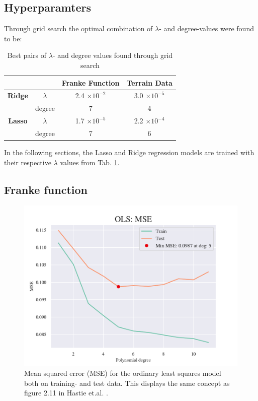 \subsection{Hyperparamters}

Through grid search the optimal combination of $\lambda$- and degree-values were found to be: 

\begin{table}[h!]
    \centering
    \begin{tabular}{|c|c|c|c|}
        \hline
        & & \textbf{Franke Function} & \textbf{Terrain Data} \\ \hline
        \textbf{Ridge} & $\lambda$ & 2.4 $\times 10^{-2}$ & 3.0 $\times 10^{-5}$ \\ 
         & degree & 7 & 4 \\ \hline
        \textbf{Lasso} & $\lambda$ & 1.7 $\times 10^{-5}$ & 2.2 $\times 10^{-4}$ \\ 
         & degree & 7 & 6 \\ \hline
    \end{tabular}
    \caption{Best pairs of $\lambda$- and degree values found through grid search}
    \label{tab:grid}
\end{table}

In the following sections, the Lasso and Ridge regression models are trained with their respective $\lambda$ values from Tab. \ref{tab:grid}. 

\subsection{Franke function}

\begin{figure}[h!]
    \centering
    \includegraphics[width=1\linewidth]{project_1/figures/figures_in_report/OLS_MSE_Franke_Noise.pdf}
    \caption{Mean squared error (MSE) for the ordinary least squares model both on training- and test data. This displays the same concept as figure 2.11 in Hastie et.al. \citep[p. 38]{hastie}.}
    \label{fig:mseols}
\end{figure}

